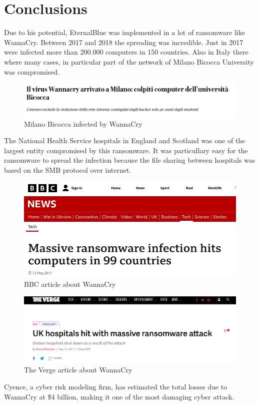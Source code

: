 \section{Conclusions}
Due to his potential, EternalBlue was implemented in a lot of ransomware like WannaCry. Between 2017
and 2018 the spreading was incredible. Just in 2017 were infected more than 200.000 computers in 150 countries.
Also in Italy there where many cases, in particular part of the network of Milano Bicocca University was compromised.\\
\begin{figure}[ht!]
    \centering
      \includegraphics[scale=0.3]{images/bicocca.png}
      \caption{Milano Bicocca infected by WannaCry\cite{repubblica-ransomware}}
\end{figure}

\noindent The National Health Service hospitals in England and Scotland was one of the largest entity compromised by this ransomware. It was particullary 
easy for the ransomware to spread the infection because the file sharing between hospitals was based on the SMB protocol over internet.
\begin{figure}[ht!]
    \centering
      \includegraphics[scale=0.3]{images/bbc.png}
      \caption{BBC article about WannaCry\cite{bbc-ransomware}}
\end{figure}

\begin{figure}[ht!]
    \centering
      \includegraphics[scale=0.3]{images/theverge.png}
      \caption{The Verge article about WannaCry\cite{theverge-ransomware}}
\end{figure}

\noindent Cyence, a cyber risk modeling firm, has estimated the total losses due to WannaCry at \$4 billion, making it one
of the most damaging cyber attack.
